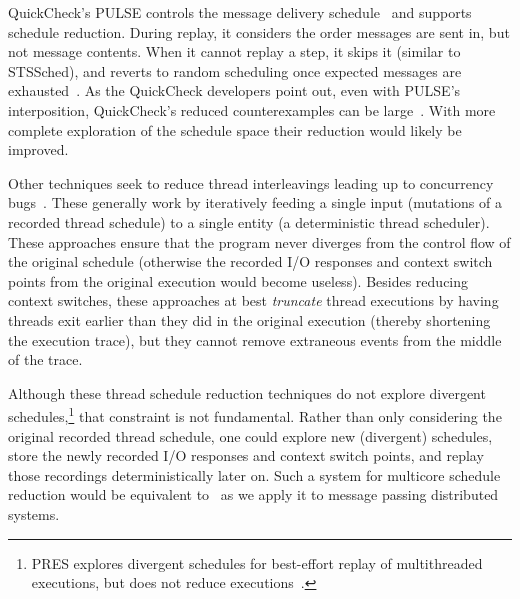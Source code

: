 
QuickCheck's PULSE controls the message delivery
schedule~\cite{claessen2009finding} and supports schedule reduction. During replay, it considers the
order messages are sent in, but not message contents.
When it cannot replay a step, it skips it (similar to
STSSched), and reverts to random scheduling once expected messages
are exhausted~\cite{hughes_email}. As the QuickCheck developers point
out, even with PULSE's interposition, QuickCheck's reduced counterexamples can be
large~\cite{pulse_counterexamples}. With more complete exploration of the
schedule space their reduction would likely be improved.

 Other techniques seek to reduce thread
interleavings leading up to concurrency
bugs~\cite{choi2002isolating,jalbert2010trace,huang2011efficient,el2014efficient}.
These generally work by iteratively feeding a single input (mutations of a
recorded thread schedule) to a single entity (a deterministic thread scheduler). These approaches
ensure that the program never diverges from the control flow of the
original schedule (otherwise the recorded I/O responses and context switch points
from the original execution would become useless). Besides reducing context
switches, these approaches at
best {\em truncate} thread executions by having threads exit earlier than they did in the original
execution (thereby shortening the execution trace), but they cannot remove extraneous events from
the middle of the trace.

Although these thread schedule reduction techniques do not
explore divergent schedules,\footnote{PRES
explores divergent schedules for best-effort replay of multithreaded
executions, but does not reduce executions~\cite{park2009pres}.}
 that constraint is not fundamental. Rather than
only considering the original recorded thread schedule, one
could explore new (divergent) schedules, store the newly recorded
I/O responses and context switch points, and replay those recordings
deterministically later on. Such a system
for multicore schedule reduction would be equivalent to \sys~as we apply it to message passing
distributed systems.


